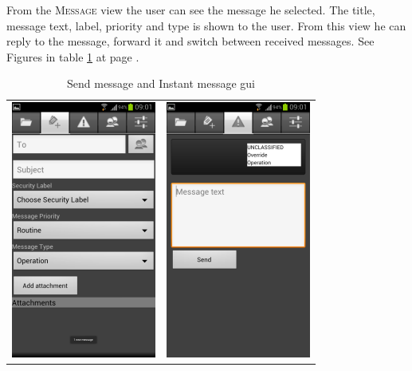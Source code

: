 From the \textsc{Message} view the user can see the message he selected. The title, message text, label, priority and type is shown to the user. From this view he can reply to the message, forward it and switch between received messages. See Figures in table \ref{tab:sendinstantmessage} at page \pageref{tab:sendinstantmessage}.
\newline
\begin{table}[h!]
\begin{center}
\begin{tabular}{cc}
\includegraphics{sendmessage} & \includegraphics{instamessage}
\end{tabular}
\caption{Send message and Instant message gui} \label{tab:sendinstantmessage}
\end{center}
\end{table}

